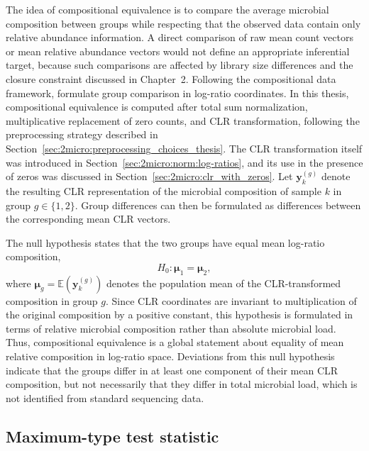 The idea of compositional equivalence is to compare the average microbial composition between groups while respecting that the observed data contain only relative abundance information. A direct comparison of raw mean count vectors or mean relative abundance vectors would not define an appropriate inferential target, because such comparisons are affected by library size differences and the closure constraint discussed in Chapter~2. Following the compositional data framework, \citet{cao2018twosample} formulate group comparison in log-ratio coordinates. In this thesis, compositional equivalence is computed after total sum normalization, multiplicative replacement of zero counts, and CLR transformation, following the preprocessing strategy described in Section~\ref{sec:2micro:preprocessing_choices_thesis}. The CLR transformation itself was introduced in Section~\ref{sec:2micro:norm:log-ratios}, and its use in the presence of zeros was discussed in Section~\ref{sec:2micro:clr_with_zeros}. Let $\mathbf{y}_k^{(g)}$ denote the resulting CLR representation of the microbial composition of sample $k$ in group $g\in\{1,2\}$. Group differences can then be formulated as differences between the corresponding mean CLR vectors.

The null hypothesis states that the two groups have equal mean log-ratio composition,
\begin{equation}
H_0:\boldsymbol{\mu}_1=\boldsymbol{\mu}_2,
\end{equation}
where $\boldsymbol{\mu}_g=\mathbb{E}\left(\mathbf{y}_k^{(g)}\right)$ denotes the population mean of the CLR-transformed composition in group $g$. Since CLR coordinates are invariant to multiplication of the original composition by a positive constant, this hypothesis is formulated in terms of relative microbial composition rather than absolute microbial load. Thus, compositional equivalence is a global statement about equality of mean relative composition in log-ratio space. Deviations from this null hypothesis indicate that the groups differ in at least one component of their mean CLR composition, but not necessarily that they differ in total microbial load, which is not identified from standard sequencing data.

\subsection{Maximum-type test statistic}
\label{sec:3community:comp_equivalence:statistic}


